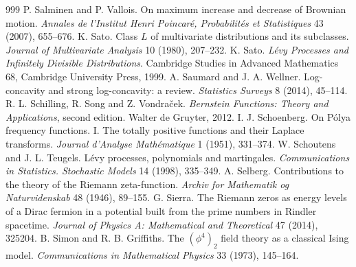 \begin{thebibliography}{999}
 P. Salminen and P. Vallois. On maximum increase and decrease of Brownian motion. \emph{Annales de l'Institut Henri Poincar\'e, Probabilit\'es et Statistiques} 43 (2007), 655--676.
 K. Sato. Class $L$ of multivariate distributions and its subclasses. \emph{Journal of Multivariate Analysis} 10 (1980), 207--232.
 K. Sato. \emph{L\'evy Processes and Infinitely Divisible Distributions}. Cambridge Studies in Advanced Mathematics 68, Cambridge University Press, 1999.
 A. Saumard and J. A. Wellner. Log-concavity and strong log-concavity: a review. \emph{Statistics Surveys} 8 (2014), 45--114.
 R. L. Schilling, R. Song and Z. Vondra\v{c}ek. \emph{Bernstein Functions: Theory and Applications}, second edition. Walter de Gruyter, 2012.
 I. J. Schoenberg. On P\'olya frequency functions. I. The totally positive functions and their Laplace transforms. \emph{Journal d'Analyse Math\'ematique} 1 (1951), 331--374.
 W. Schoutens and J. L. Teugels. L\'evy processes, polynomials and martingales. \emph{Communications in Statistics. Stochastic Models} 14 (1998), 335--349.
 A. Selberg. Contributions to the theory of the Riemann zeta-function. \emph{Archiv for Mathematik og Naturvidenskab} 48 (1946), 89--155.
 G. Sierra. The Riemann zeros as energy levels of a Dirac fermion in a potential built from the prime numbers in Rindler spacetime. \emph{Journal of Physics A: Mathematical and Theoretical} 47 (2014), 325204.
 B. Simon and R. B. Griffiths. The $(\phi^4)_2$ field theory as a classical Ising model. \emph{Communications in Mathematical Physics} 33 (1973), 145--164.

\end{thebibliography}
